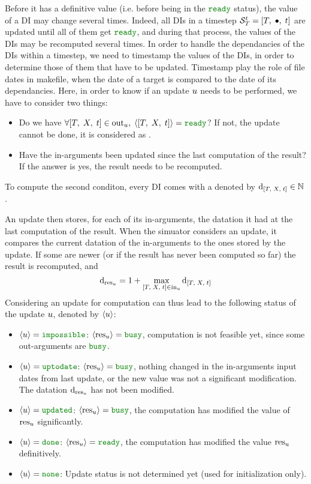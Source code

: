 Before it has a definitive value (i.e. before being in the $\cxReady$ status), the value of a DI may change several times. Indeed, all DIs in a timestep ${{{\cal S}}_{T}^{t}} = {\left[ T,\;\bullet,\;t \right]}$ are updated until all of them get $\cxReady$, and during that process, the values of the DIs may be recomputed several times. In order to handle the dependancies of the DIs within a timestep, we need to timestamp the values of the DIs, in order to determine those of them that have to be updated. Timestamp play the role of file dates in makefile, when the date of a target is compared to the date of its dependancies. Here, in order to know if an update $u$ needs to be performed, we have to consider two things:
\begin{itemize}
\item Do we have $\cxAllReady$? If not, the update cannot be done, it is considered as .
\item Have the in-arguments been updated since the last computation of the result? If the answer is yes, the result needs to be recomputed.
\end{itemize}

To compute the second conditon, every DI comes with a  denoted by ${{\mathrm{d}}_{\left[ T,\;X,\;t \right]}} \in {\mathbb{N}}$.

An update then stores, for each of its in-arguments, the datation it had at the last computation of the result. When the simuator considers an update, it compares the current datation of the in-arguments to the ones stored by the update. If some are newer (or if the result has never been computed so far) the result is recomputed, and
\begin{equation}
  {{\mathrm{d}}_{{\mathrm{res}}_{u}}} = {{1} + {\displaystyle\mathop{\mathrm{max}}_{{\left[ T,\;X,\;t \right]} \in {{\mathrm{in}}_{u}}}{{\mathrm{d}}_{\left[ T,\;X,\;t \right]}}}}
\end{equation}
Considering an update for computation can thus lead to the following status of the update $u$, denoted by $\left< u \right>$:
\begin{itemize}
\item $\cxStatusImpossible$: $\cxResBusy$, computation is not feasible yet, since some out-arguments are $\cxBusy$.
\item $\cxStatusUpToDate$:  $\cxResBusy$, nothing changed in the in-arguments input dates from last update, or the new value was not a significant modification. The datation ${\mathrm{d}}_{{\mathrm{res}}_{u}}$ has not been modified.
\item $\cxStatusUpdated$:   $\cxResBusy$, the computation has modified the value of ${\mathrm{res}}_{u}$ significantly.
\item $\cxStatusDone$:      $\cxResReady$, the computation has modified the value ${\mathrm{res}}_{u}$ definitively.
\item $\cxStatusNone$:      Update status is not determined yet (used for initialization only).
\end{itemize}

